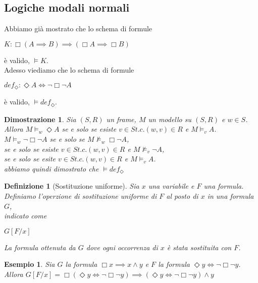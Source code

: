 \documentclass[a4paper,12pt]{article}
\theoremstyle{def}
\newtheorem*{definition}{Definizione}
\theoremstyle{prop}
\theoremstyle{esempio}
\newtheorem*{example}{Esempio}
\theoremstyle{dimostrazione}
\newtheorem*{dimostrazione}{Dimostrazione}
\theoremstyle{teo}
\theoremstyle{osservazione}
\begin{document}
\subsection{Logiche modali normali}
Abbiamo già mostrato che lo schema di formule
\begin{center}
	\(K: \Box (A \implies B) \implies (\Box A \implies \Box B)\)
\end{center}
è valido, \(\vDash K\).\\
Adesso viediamo che lo schema di formule
\begin{center}
	\(def_\Diamond : \Diamond A \iff \neg \Box \neg A\)
\end{center}
è valido, \(\vDash def_\Diamond\).\\
\begin{dimostrazione}
	Sia \((S,R)\) un frame, \(M\) un modello su \((S,R)\) e \(w \in S\).\\
	Allora \(M \vDash_w \Diamond A\) se e solo se esiste \(v \in S t.c. (w,v) \in R\) e \(M \vDash_v A\).\\
	\(M \vDash_w \neg \Box \neg A\) se e solo se \(M \nvDash_w \Box \neg A\),\\
	se e solo se esiste \(v \in S t.c. (w,v) \in R\) e \(M \nvDash_v \neg A\),\\
	se e solo se esite \(v \in S t.c. (w,v) \in R\) e \(M \vDash_v A\).\\
	abbiamo quindi dimostrato che \(\vDash def_\Diamond\)
\end{dimostrazione}
\begin{definition}[Sostituzione uniforme]
	Sia \(x\) una variabile e \(F\) una formula.\\
	Definiamo l'operzione di sostituzione uniforme di \(F\) al posto di \(x\) in una formula \(G\),\\
	indicato come
	\begin{center}
		\(G[F/x]\)
	\end{center}
	La formula ottenuta da \(G\) dove ogni occorrenza di \(x\) è stata sostituita con \(F\).
\end{definition}
\begin{example}
	Sia \(G\) la formula \(\Box x \implies x \land y\) e \(F\) la formula \(\Diamond y \iff \neg \Box \neg y\).\\
	Allora \(G[F/x] = \Box (\Diamond y \iff \neg \Box \neg y) \implies (\Diamond y \iff \neg \Box \neg y) \land y\)
\end{example}
\end{document}
